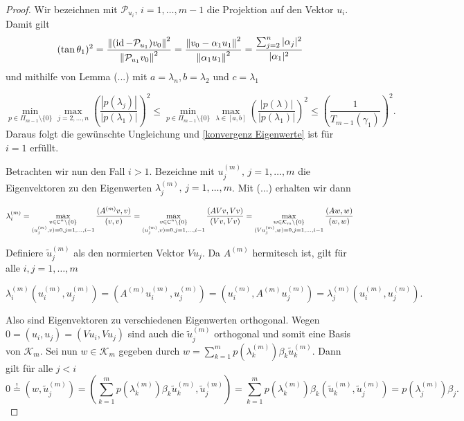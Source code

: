 \documentclass{article}
\begin{document}
\begin{theorem}
\begin{proof}
	Wir bezeichnen mit $\mathcal{P}_{u_i}, \, i = 1,\dots, m-1$ die Projektion auf den Vektor $u_i$. Damit gilt
		\begin{equation*}
			(\tan\theta_1)^2 = \frac{{\left \| (\operatorname{id} - \mathcal{P}_{u_1})v_0 \right \|}_{}^2}{{\left \|  \mathcal{P}_{u_1}v_0 \right \|}_{}^2} = \frac{{\left \| v_0 - \alpha_1 u_1 \right \|}_{}^2}{{\left \| \alpha_1 u_1 \right \|}_{}^2} = \frac{\sum_{j=2}^{n} |\alpha_j|^2}{|\alpha_1|^2}
		\end{equation*}
	und mithilfe von Lemma (...) mit $a = \lambda_n, b= \lambda_2$ und $c= \lambda_1$

		\begin{equation*}
			\min_{p\in \Pi_{m-1}\setminus \{0\}} \max_{j=2,\dots,n} 		\left(\frac{|p(\lambda_j)|}{|p(\lambda_1)|}\right)^2 \le \min_{p\in \Pi_{m-1}\setminus \{0\}} \max_{\lambda \in [a,b]} \left(\frac{|p(\lambda)|}{|p(\lambda_1)|}\right)^2 \le \left(\frac{1}{T_{m-1}(\gamma_1)}\right)^2.
		\end{equation*}
	Daraus folgt die gewünschte Ungleichung und \ref{konvergenz Eigenwerte} ist für $i = 1$ erfüllt.

	Betrachten wir nun den Fall $i>1$.
	Bezeichne mit $u_j^{(m)}, \, j = 1,\dots, m$ die Eigenvektoren zu den Eigenwerten $\lambda_j^{(m)} , \, j = 1,\dots, m$. Mit (...) erhalten wir dann

	\begin{equation*}
		\lambda_i^{(m)} = \max_{\substack{v\in \mathbb{C}^n\setminus \{0\} \\ (u_j^{(m)},v) = 0, j = 1,\dots,i-1}} \frac{(A^{(m)}v,v)}{(v,v)} = \max_{\substack{v\in \mathbb{C}^n\setminus \{0\} \\ (u_j^{(m)},v) = 0, j = 1,\dots,i-1}} \frac{(AVv,Vv)}{(Vv,Vv)} = \max_{\substack{w\in \mathcal{K}_m\setminus \{0\} \\ (Vu_j^{(m)},w) = 0, j = 1,\dots,i-1}} \frac{(Aw,w)}{(w,w)}
	\end{equation*}


	Definiere  $\tilde{u}_j^{(m)}$ als den normierten Vektor $Vu_j$. Da $A^{(m)}$ hermitesch ist, gilt für alle $i,j = 1,\dots, m$

	\begin{equation*}
		\lambda^{(m)}_i (u_i^{(m)}, u_j^{(m)}) = (A^{(m)}u_i^{(m)}, u_j^{(m)}) = (u_i^{(m)}, A^{(m)}u_j^{(m)}) = \lambda^{(m)}_j (u_i^{(m)}, u_j^{(m)}).
	\end{equation*}

	Also sind Eigenvektoren zu verschiedenen Eigenwerten orthogonal. Wegen $ 0 = (u_i, u_j) = (Vu_i, Vu_j)$ sind auch die $\tilde{u}_j^{(m)}$ orthogonal und somit eine Basis von $\mathcal{K}_m$. Sei nun $w\in \mathcal{K}_m$ gegeben durch $w = \sum_{k=1}^{m} p(\lambda_k^{(m)}) \beta_k \tilde{u}_k^{(m)}$. Dann gilt für alle $j < i$
	\begin{equation*}
		0 \stackrel{!}{=} (w,\tilde{u}_j^{(m)}) = (\sum_{k=1}^{m} p(\lambda_k^{(m)}) \beta_k \tilde{u}_k^{(m)},\tilde{u}_j^{(m)}) = \sum_{k=1}^{m} p(\lambda_k^{(m)}) \beta_k (\tilde{u}_k^{(m)},\tilde{u}_j^{(m)}) = p(\lambda_j^{(m)}) \beta_j.
	\end{equation*}


\end{proof}
\end{theorem}
\end{document}
